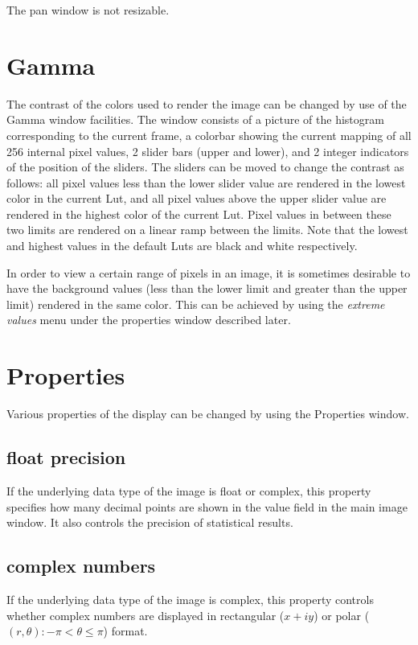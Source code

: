 The pan window is not resizable.

\section{Gamma}
The contrast of the colors used to render the image can be changed by use of the Gamma window facilities. The window consists of a picture of the histogram corresponding to the current frame, a colorbar showing the current mapping of all 256 internal pixel values, 2 slider bars (upper and lower), and 2 integer indicators of the position of the sliders. The sliders can be moved to change the contrast as follows: all pixel values less than the lower slider value are rendered in the lowest color in the current Lut, and all pixel values above the upper slider value are rendered in the highest color of the current Lut. Pixel values in between these two limits are rendered on a linear ramp between the limits. Note that the lowest and highest values in the default Luts are black and white respectively.

In order to view a certain range of pixels in an image, it is sometimes desirable to have the background values (less than the lower limit and greater than the upper limit) rendered in the same color. This can be achieved by using the {\it extreme values\/} menu under the properties window described later.

\section{Properties}
Various properties of the display can be changed by using the Properties window.

\subsection{float precision}
If the underlying data type of the image is float or complex, this property specifies how many decimal points are shown in the value field in the main image window. It also controls the precision of statistical results.

\subsection{complex numbers}
If the underlying data type of the image is complex, this property controls whether complex numbers are displayed in rectangular ($x+iy$) or polar ($(r,\theta): -\pi < \theta \leq \pi$) format.

